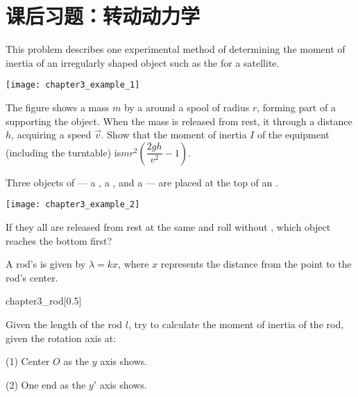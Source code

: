 \newpage
\section{课后习题：转动动力学}
\begin{example}
	This problem describes one experimental method of
	determining the moment of inertia of an irregularly
	shaped object such as the  for a satellite. 
	\begin{center}
		\texttt{[image: chapter3\_example\_1]}
	\end{center}
	
	The figure shows a mass $m$  by a  
	around a spool of radius $r$, forming part of a 
	supporting the object. When the mass is released from
	rest, it  through a distance $h$, acquiring a speed
	$\vec{v}$. Show that the moment of inertia $I$ of the equipment
	(including the turntable) is\quad$mr^2(\dfrac{2gh}{v^2}-1)$. 
\end{example}
\begin{example}
	Three objects of  --- a , a , and a  --- are placed at the top of
	an . 
	\begin{center}
		\texttt{[image: chapter3\_example\_2]}
	\end{center}
	If they all are released from rest
	at the same  and roll without , which object reaches the bottom first?
\end{example}
\begin{example}
	A rod's  is given by $\lambda=kx$, where $x$ represents the distance from the point to the rod's center. 
	\begin{singlefigure}{chapter3_rod}[0.5]
	\end{singlefigure}
	Given the length of the rod $l$, try to calculate the moment of inertia of the rod, given the rotation axis at:
	
	(1) Center $O$ as the $y$ axis shows.
	
	(2) One end as the $y'$ axis shows.
\end{example}
